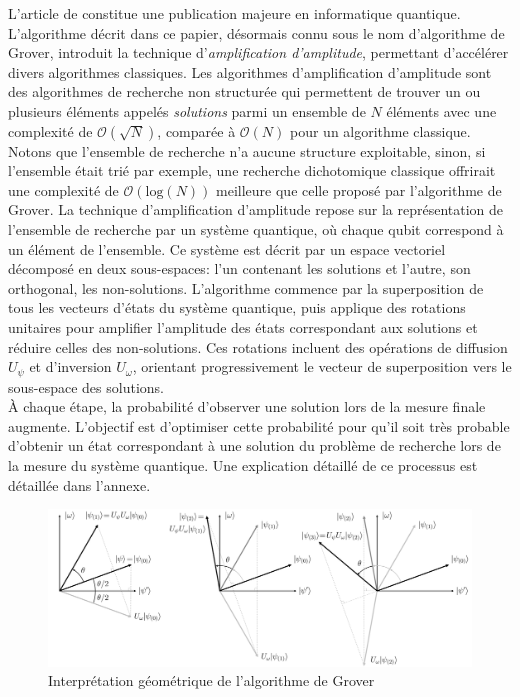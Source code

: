 L'article de \cite{grover1996fast} constitue une publication majeure en informatique quantique. L'algorithme décrit dans ce papier, désormais connu sous le nom d’algorithme de Grover, introduit la technique d'\textit{amplification d'amplitude}, permettant d'accélérer divers algorithmes classiques. Les algorithmes d'amplification d'amplitude sont des algorithmes de recherche non structurée qui permettent de trouver un ou plusieurs éléments appelés \textit{solutions} parmi un ensemble de $N$ éléments avec une complexité de $\mathcal{O}(\sqrt{N})$, comparée à $\mathcal{O}(N)$ pour un algorithme classique. 
\\
Notons que l'ensemble de recherche n'a aucune structure exploitable, sinon, si l'ensemble était trié par exemple, une recherche dichotomique classique offrirait une complexité de $\mathcal{O}(\mathrm{log}(N))$ meilleure que celle proposé par l'algorithme de Grover. La technique d'amplification d'amplitude repose sur la représentation de l'ensemble de recherche par un système quantique, où chaque qubit correspond à un élément de l'ensemble. Ce système est décrit par un espace vectoriel décomposé en deux sous-espaces: l'un contenant les solutions et l'autre, son orthogonal, les non-solutions. L'algorithme commence par la superposition de tous les vecteurs d'états du système quantique, puis applique des rotations unitaires pour amplifier l'amplitude des états correspondant aux solutions et réduire celles des non-solutions. Ces rotations incluent des opérations de diffusion $U_{\psi}$ et d'inversion $U_{\omega}$, orientant progressivement le vecteur de superposition vers le sous-espace des solutions.
\\
À chaque étape, la probabilité d'observer une solution lors de la mesure finale augmente. L'objectif est d'optimiser cette probabilité pour qu'il soit très probable d'obtenir un état correspondant à une solution du problème de recherche lors de la mesure du système quantique. Une explication détaillé de ce processus est détaillée dans l'annexe. %

\begin{figure}[H]
\centering
\includegraphics[scale=0.30]{GroverGeom.png}
\caption{Interprétation géométrique de l'algorithme de Grover}
\label{fig:GroverGeom}
\end{figure}
\noindent

